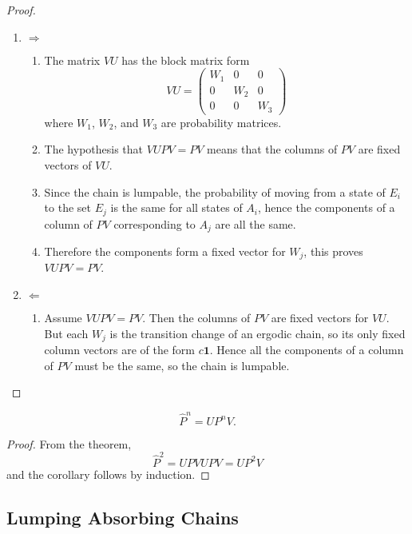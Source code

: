 \documentclass[12pt]{article}
\begin{document}
\begin{proof}
  \begin{enumerate}
  \item $\Rightarrow$
    \begin{enumerate}
    \item The matrix $VU$ has the block matrix form
      \[
        VU =
        \begin{pmatrix}
          W_1 & 0 & 0 \\
          0   & W_2 & 0 \\
          0   & 0   & W_3
        \end{pmatrix}
      \]
      where $W_1$, $W_2$, and $W_3$ are probability matrices.
    \item The hypothesis that \( VUPV = PV \) means that the columns
      of $PV$ are fixed vectors of $VU$.
    \item Since the chain is lumpable, the probability of moving from a
      state of $E_i$ to the set $E_j$ is the same for all states of
      $A_i$, hence the components of a column of $PV$ corresponding to
      $A_j$ are all the same.
    \item Therefore the components form a fixed vector for $W_j$, this proves
      \(VUPV = PV \).
    \end{enumerate}
  \item $\Leftarrow$
    \begin{enumerate}
    \item Assume \(VUPV = PV \).  Then the columns of $PV$ are fixed
      vectors for $VU$.  But each $W_j$ is the transition change of an
      ergodic chain, so its only fixed column vectors are of the form
      $c \mathbf{1}$.  Hence all the components of a column of $PV$ must be
      the same, so the chain is lumpable.
    \end{enumerate}
  \end{enumerate}
\end{proof}

\begin{corollary}
  \[
    \hat{P}^n = U P^n V.
  \]
\end{corollary}

\begin{proof}
  From the theorem,
  \[
    \hat{P}^2 = U P V U P V = U P^2 V
  \]
  and the corollary follows by induction.
\end{proof}


\subsection*{Lumping Absorbing Chains}
\end{document}
